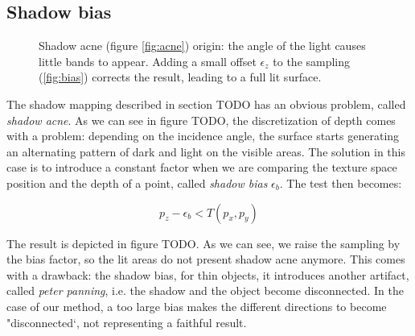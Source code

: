 \subsection{Shadow bias}

\begin{figure}
\centering
{}
\caption{Shadow acne (figure \ref{fig:acne}) origin: the angle of the light causes little bands to appear. Adding a small offset $\epsilon_z$ to the sampling (\ref{fig:bias}) corrects the result, leading to a full lit surface.}
\label{fig:shadowbias}
\end{figure}


The shadow mapping described in section TODO has an obvious problem, called \emph{shadow acne}. As we can see in figure TODO, the discretization of depth comes with a problem: depending on the incidence angle, the surface starts generating an alternating pattern of dark and light on the visible areas. The solution in this case is to introduce a constant factor when we are comparing the texture space position and the depth of a point, called \emph{shadow bias} $\epsilon_b$. The test then becomes:

$$
p_z - \epsilon_b < T(p_x,p_y)
$$ 

The result is depicted in figure TODO. As we can see, we raise the sampling by the bias factor, so the lit areas do not present shadow acne anymore. This comes with a drawback: the shadow bias, for thin objects, it introduces another artifact, called \emph{peter panning}, i.e. the shadow and the object become disconnected. In the case of our method, a too large bias makes the different directions to become "disconnected`, not representing a faithful result. 

